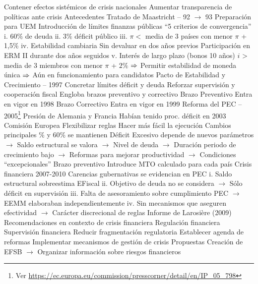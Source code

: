 \documentclass{nuevotema}
\begin{document}
\begin{esquemal}
				\4 Contener efectos sistémicos de crisis nacionales
				\4 Aumentar transparencia de políticas ante crisis
		\2 Antecedentes
			\3 Tratado de Maastricht -- 92 $\to$ 93
				\4 Preparación para UEM
				\4 Introducción de límites finanzas públicas
				\4[] ``5 criterios de convergencia''
				\4[] i. 60\% de deuda
				\4[] ii. 3\% déficit público
				\4[] iii. $\pi <$ media de 3 países con menor $\pi$ + 1,5\%
				\4[] iv. Estabilidad cambiaria
				\4[] \quad Sin devaluar en dos años previos
				\4[] \quad Participación en ERM II durante dos años seguidos
				\4[] v. Interés de largo plazo (bonos 10 años)
				\4[] \quad $i$ > media de 3 miembros con menor $\pi$ + $2\%$
				\4[] $\Rightarrow$ Permitir estabilidad de moneda única
				\4[] $\Rightarrow$ Aún en funcionamiento para candidatos
			\3 Pacto de Estabilidad y Crecimiento -- 1997
				\4 Concretar límites déficit y deuda
				\4 Reforzar supervisión y cooperación fiscal
				\4 Engloba brazos preventivo y correctivo
			\3 Brazo Preventivo
				\4 Entra en vigor en 1998
			\3 Brazo Correctivo
				\4 Entra en vigor en 1999
			\3 Reforma del PEC -- 2005\footnote{Ver \url{https://ec.europa.eu/commission/presscorner/detail/en/IP_05_798}}
				\4 Presión de Alemania y Francia
				\4[] Habían tenido proc. déficit en 2003
				\4 Comisión Europea
				\4[] Flexibilizar reglas
				\4[] Hacer más fácil la ejecución
				\4 Cambios principales
				\% y 60\% se mantienen
				\4[] Déficit Excesivo depende de nuevos parámetros
				\4[] $\to$ Saldo estructural se valora
				\4[] $\to$ Nivel de deuda
				\4[] $\to$ Duración periodo de crecimiento bajo
				\4[] $\to$ Reformas para mejorar productividad
				\4[] $\to$ Condiciones ``excepcionales''
				\4 Brazo preventivo
				\4[] Introduce MTO calculado para cada país
			\3 Crisis financiera 2007-2010
				\4 Carencias gubernativas se evidencian en PEC
				\4[] i. Saldo estructural sobreestima EFiscal
				\4[] ii. Objetivo de deuda no se considera
				\4[] $\to$ Sólo déficit en supervisión
				\4[] iii. Falta de asesoramiento sobre cumplimiento PEC
				\4[] $\to$ EEMM elaboraban independientemente
				\4[] iv. Sin mecanismos que aseguren efectividad
				\4[] $\to$ Carácter discrecional de reglas
			\3 Informe de Larosière (2009)
				\4 Recomendaciones en contexto de crisis financiera
				\4[] Regulación financiera
				\4[] Supervisión financiera
				\4[] Reducir fragmentación regulatoria
				\4[] Establecer agenda de reformas
				\4[] Implementar mecanismos de gestión de crisis
				\4 Propuestas
				\4[] Creación de EFSB
				\4[] $\to$ Organizar información sobre riesgos financieros

\end{esquemal}
\end{document}

